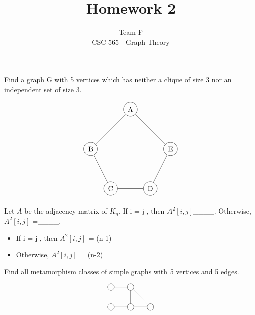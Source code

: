 \documentclass[12pt]{article}
\newenvironment{question}[2][Question]{\begin{trivlist}
\item[\hskip \labelsep {\bfseries #1}\hskip \labelsep {\bfseries #2.}]}{\end{trivlist}}
\begin{document}


\title{Homework 2}%
\author{Team F\\ %
CSC 565 - Graph Theory} %

\maketitle

\begin{question}{1}
Find a graph G with 5 vertices which has neither a clique of size 3 nor an independent set of size 3.
\end{question}

\begin{align*}
\begin{tikzpicture}
    \node[shape=circle,draw=black] (C) at (1,0) {C};
    \node[shape=circle,draw=black] (B) at (0,2) {B};
    \node[shape=circle,draw=black] (A) at (2,4) {A};
    \node[shape=circle,draw=black] (D) at (3,0) {D};
    \node[shape=circle,draw=black] (E) at (4,2) {E};
    \path [] (A) edge node[left] {} (B);
    \path [] (B) edge node[left] {} (C);
    \path [] (C) edge node[left] {} (D);
    \path [] (D) edge node[left] {} (E);
    \path [] (E) edge node[left] {} (A);
\end{tikzpicture}
\end{align*}

\begin{question}{4} 
	Let $A$ be the adjacency matrix of  $K_n$. If i = j , then $A^{2}[i,j]$\_\_\_\_.  Otherwise, $A^{2}[i,j]$ =\_\_\_\_. 
\end{question}

\begin{itemize}
\item If i = j , then $A^{2}[i,j]$ = (n-1)
\item Otherwise,   $A^{2}[i,j]$ = (n-2)
\end{itemize}


\begin{question}{2}
	Find all metamorphism classes of simple graphs with 5 vertices and 5 edges.
\end{question}


\begin{align*}
\begin{tikzpicture}
\node[shape=circle,draw=black] (A) at (0,0) {};
\node[shape=circle,draw=black] (B) at (1,0) {};
\node[shape=circle,draw=black] (C) at (0,-1) {};
\node[shape=circle,draw=black] (D) at (1,-1) {};
\node[shape=circle,draw=black] (E) at (2,-1) {};
\path [] (A) edge node[left] {} (B);
\path [] (C) edge node[left] {} (D);
\path [] (B) edge node[left] {} (D);
\path [] (B) edge node[left] {} (E);
\path [] (D) edge node[left] {} (E);
\end{tikzpicture}
\end{align*}
\end{document}
